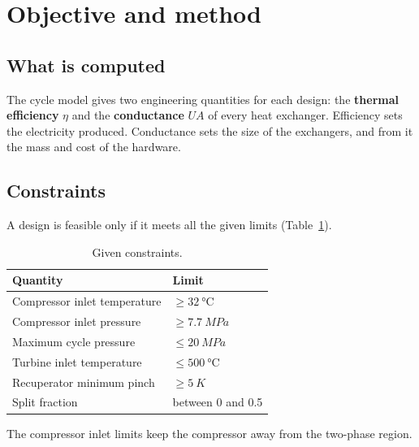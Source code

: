 \section{Objective and method}\label{sec:objective}

\subsection{What is computed}
The cycle model gives two engineering quantities for each design: the \textbf{thermal efficiency} $\eta$ and the \textbf{conductance} $UA$ of every heat exchanger. Efficiency sets the electricity produced. Conductance sets the size of the exchangers, and from it the mass and cost of the hardware.


\subsection{Constraints}
A design is feasible only if it meets all the given limits (Table~\ref{tab:constraints}).

\begin{table}[!htbp]\centering\small
\begin{tabular}{ll}
\toprule
Quantity & Limit\\
\midrule
Compressor inlet temperature & $\geq \SI{32}{\celsius}$\\
Compressor inlet pressure & $\geq \SI{7.7}{MPa}$\\
Maximum cycle pressure & $\leq \SI{20}{MPa}$\\
Turbine inlet temperature & $\leq \SI{500}{\celsius}$\\
Recuperator minimum pinch & $\geq \SI{5}{K}$\\
Split fraction & between 0 and 0.5\\
\bottomrule
\end{tabular}
\caption{Given constraints.}\label{tab:constraints}
\end{table}

The compressor inlet limits keep the compressor away from the two-phase region.

